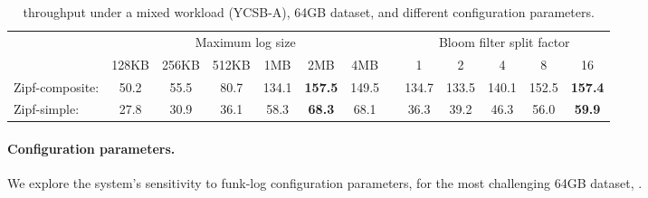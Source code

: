 \begin{table}
\centering
{\small{
\begin{tabular}{l|cccccc|c|ccccc|}
\cline{2-7} \cline{9-13} 
  & \multicolumn{6}{c|}{Maximum log size} & & \multicolumn{5}{c|}{Bloom filter split factor}\\
& 128KB & 256KB & 512KB & 1MB & 2MB & 4MB & &1 & 2 & 4 & 8 & 16 \\
\cline{2-7} \cline{9-13} 
Zipf-composite: & 50.2	& 55.5 & 80.7	& 134.1 & {\bf {157.5}} & 149.5 & & 134.7 & 133.5 & 140.1 & 152.5 & {\bf {157.4}}   \\
Zipf-simple:    & 27.8	& 30.9 & 36.1	& 58.3  & {\bf {68.3}}   & 68.1   & &  36.3 & 39.2   & 46.3  & 56.0  & {\bf {59.9}}\\
\cline{2-7} \cline{9-13} 
\end{tabular}
}}
\caption{{\sys\/ throughput under a mixed workload (YCSB-A), 64GB dataset, and different configuration parameters.}}
\label{fig:wal}
\end{table}

\paragraph{Configuration parameters.} 
We explore the system's  sensitivity to funk-log configuration parameters, for the most challenging 64GB dataset,
. 

